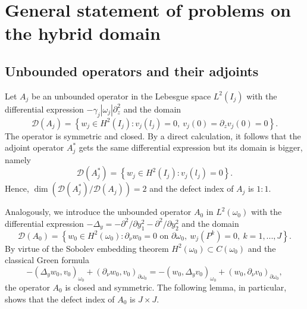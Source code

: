 \documentclass[11pt]{article}%
\numberwithin{equation}{section}
\begin{document}
\section{General statement of problems on the hybrid domain\label{sect2}}

\subsection{Unbounded operators and their adjoints\label{sect2.1}}

Let $A_{j}$ be an unbounded operator in the Lebesgue space $L^{2}(I_{j})$ with
the differential expression $-\gamma_{j}|\omega_{j}|\partial_{z}^{2}$ and the
domain%
\begin{equation}
\mathcal{D}(A_{j})=\left\{  w_{j}\in H^{2}(I_{j}):v_{j}(l_{j})=0,\ v_{j}%
(0)=\partial_{z}v_{j}(0)=0\right\}  . \label{A1}%
\end{equation}
The operator is symmetric and closed. By a direct calculation, it follows that
the adjoint operator $A_{j}^{\ast}$ gets the same differential expression but
its domain is bigger, namely%
\begin{equation}
\mathcal{D}(A_{j}^{\ast})=\left\{  w_{j}\in H^{2}(I_{j}):v_{j}(l_{j}%
)=0\right\}  . \label{A2}%
\end{equation}
Hence, $\dim(\mathcal{D}(A_{j}^{\ast})/\mathcal{D}(A_{j}))=2$ and the defect
index of $A_{j}$ is $1:1$.

Analogously, we introduce the unbounded operator $A_{0}$ in $L^{2}(\omega
_{0})$ with the differential expression $-\Delta_{y}=-\partial^{2}/\partial
y_{1}^{2}-\partial^{2}/\partial y_{2}^{2}$ and the domain
\begin{equation}
\mathcal{D}(A_{0})=\left\{  w_{0}\in H^{2}(\omega_{0}):\partial_{\nu}%
w_{0}=0\text{ on }\partial\omega_{0},\ w_{j}(P^{k})=0,\ k=1,...,J\right\}  .
\label{A3}%
\end{equation}
By virtue of the Sobolev embedding theorem $H^{2}(\omega_{0})\subset
C(\omega_{0})$ and the classical Green formula%
\begin{equation}
-(\Delta_{y}w_{0},v_{0})_{\omega_{0}}+(\partial_{\nu}w_{0},v_{0}%
)_{\partial\omega_{0}}=-(w_{0},\Delta_{y}v_{0})_{\omega_{0}}+(w_{0}%
,\partial_{\nu}v_{0})_{\partial\omega_{0}}, \label{A4}%
\end{equation}
the operator $A_{0}$ is closed and symmetric. The following lemma, in
particular, shows that the defect index of $A_{0}$ is $J\times J$.
\end{document}
